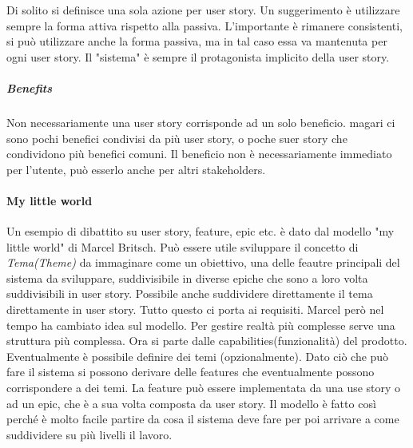 \noindent Di solito si definisce una sola azione per user story. Un suggerimento è utilizzare sempre la forma attiva rispetto alla passiva. L'importante è rimanere consistenti, si può utilizzare anche la forma passiva, ma in tal caso essa va mantenuta per ogni user story. Il "sistema" è sempre il protagonista implicito della user story.
\subparagraph{Benefits}
Non necessariamente una user story corrisponde ad un solo beneficio. magari ci sono pochi benefici condivisi da più user story, o poche suer story che condividono più benefici comuni. Il beneficio non è necessariamente immediato per l'utente, può esserlo anche per altri stakeholders.

\paragraph{My little world}
Un esempio di dibattito su user story, feature, epic etc. è dato dal modello "my little world" di Marcel Britsch. Può essere utile sviluppare il concetto di \textit{Tema(Theme)} da immaginare come un obiettivo, una delle feautre principali del sistema da sviluppare, suddivisibile in diverse epiche che sono a loro volta suddivisibili in user story. Possibile anche suddividere direttamente il tema direttamente in user story. Tutto questo ci porta ai requisiti.\newline
{}
Marcel però nel tempo ha cambiato idea sul modello. Per gestire realtà più complesse serve una struttura più complessa. Ora si parte dalle capabilities(funzionalità) del prodotto. Eventualmente è possibile definire dei temi (opzionalmente). Dato ciò che può fare il sistema si possono derivare delle features che eventualmente possono corrispondere a dei temi. La feature può essere implementata da una use story o ad un epic, che è a sua volta composta da user story. Il modello è fatto così perché è molto facile partire da cosa il sistema deve fare per poi arrivare a come suddividere su più livelli il lavoro.

